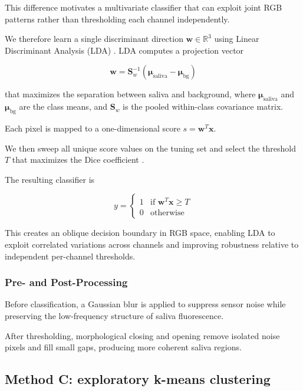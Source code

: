 This difference motivates a multivariate classifier that can exploit joint RGB patterns rather than thresholding each channel independently.

We therefore learn a single discriminant direction \(\mathbf{w} \in \mathbb{R}^3\) using Linear Discriminant Analysis (LDA) \cite{fisher1936use}. LDA computes a projection vector

\begin{equation}
  \mathbf{w} = \mathbf{S}_w^{-1}(\boldsymbol{\mu}_{\text{saliva}} - \boldsymbol{\mu}_{\text{bg}})
\end{equation}

that maximizes the separation between saliva and background, where \(\boldsymbol{\mu}_{\text{saliva}}\) and \(\boldsymbol{\mu}_{\text{bg}}\) are the class means, and \(\mathbf{S}_w\) is the pooled within-class covariance matrix.

Each pixel is mapped to a one-dimensional score \(s = \mathbf{w}^T\mathbf{x}\).

We then sweep all unique score values on the tuning set and select the threshold \(T\) that maximizes the Dice coefficient \cite{dice1945measures}.

The resulting classifier is

\begin{equation}
  y = \begin{cases}
    1 & \text{if } \mathbf{w}^T\mathbf{x} \geq T \\
    0 & \text{otherwise}
  \end{cases}
\end{equation}

This creates an oblique decision boundary in RGB space, enabling LDA to exploit correlated variations across channels and improving robustness relative to independent per-channel thresholds.

\subsubsection{Pre- and Post-Processing}

Before classification, a Gaussian blur is applied to suppress sensor noise while preserving the low-frequency structure of saliva fluorescence.

After thresholding, morphological closing and opening remove isolated noise pixels and fill small gaps, producing more coherent saliva regions.

\subsection{Method C: exploratory k-means clustering}


